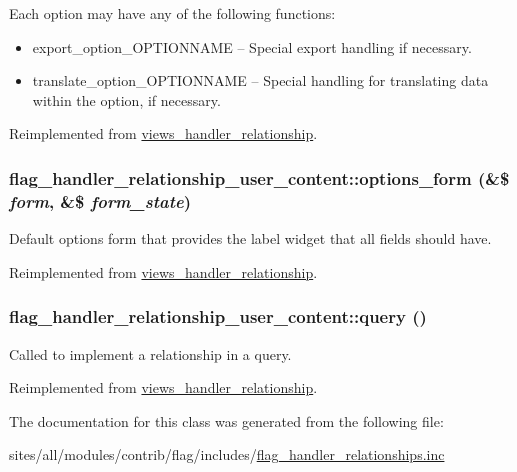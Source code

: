  Each option may have any of the following functions:\begin{itemize}
\item export\_\-option\_\-OPTIONNAME -- Special export handling if necessary.\item translate\_\-option\_\-OPTIONNAME -- Special handling for translating data within the option, if necessary. \end{itemize}


Reimplemented from \hyperlink{classviews__handler__relationship_7e7b7a0056836612aa50a60575a3d549}{views\_\-handler\_\-relationship}.\hypertarget{classflag__handler__relationship__user__content_21d3592facff0d6f32b52685f78259b7}{
\subsubsection[{options\_\-form}]{\setlength{\rightskip}{0pt plus 5cm}flag\_\-handler\_\-relationship\_\-user\_\-content::options\_\-form (\&\$ {\em form}, \/  \&\$ {\em form\_\-state})}}
\label{classflag__handler__relationship__user__content_21d3592facff0d6f32b52685f78259b7}


Default options form that provides the label widget that all fields should have. 

Reimplemented from \hyperlink{classviews__handler__relationship_08cc3f5947964d936b5e88d198f82c30}{views\_\-handler\_\-relationship}.\hypertarget{classflag__handler__relationship__user__content_d6d40590ad33616b0a55395d60d1166b}{
\subsubsection[{query}]{\setlength{\rightskip}{0pt plus 5cm}flag\_\-handler\_\-relationship\_\-user\_\-content::query ()}}
\label{classflag__handler__relationship__user__content_d6d40590ad33616b0a55395d60d1166b}


Called to implement a relationship in a query. 

Reimplemented from \hyperlink{classviews__handler__relationship_7dc0b6371807dbf06efa594cb52b3348}{views\_\-handler\_\-relationship}.

The documentation for this class was generated from the following file:\begin{CompactItemize}
\item 
sites/all/modules/contrib/flag/includes/\hyperlink{flag__handler__relationships_8inc}{flag\_\-handler\_\-relationships.inc}\end{CompactItemize}
